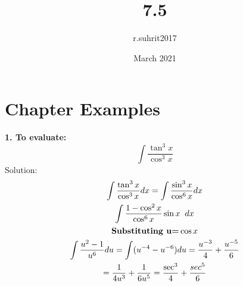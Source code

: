 \documentclass{article}
\title{7.5}
\author{r.suhrit2017 }
\date{March 2021}
\begin{document}
\maketitle

\section{Chapter Examples}
\textbf{1. To evaluate:} $$\int \frac{\tan^3 x}{\cos^3 x}$$
Solution:
\begin{gather*}
   \int \frac{\tan^3 x}{\cos^3 x} dx = \int \frac{\sin^3 x}{\cos^6 x}dx
    \\\int \frac{1-\cos^2 x}{\cos^6 x} \sin x\hspace{2mm} dx
    \\\textbf{Substituting u=}\cos x
    \\\int \frac{u^2-1}{u^6}du = \int (u^{-4}-u^{-6}) du = \frac{u^{-3}}{4} +\frac{u^{-5}}{6} \\=\frac{1}{4u^3}+\frac{1}{6u^5}=\frac{\sec^3}{4}+\frac{sec^5}{6}
\end{gather*}
\end{document}
